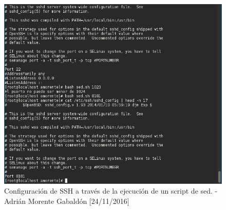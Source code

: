 	\begin{figure}[H]
		\centering
		\includegraphics[scale=0.55]{sed-sh}
		\caption{Configuración de SSH a través de la ejecución de un script de sed. - Adrián Morente Gabaldón [24/11/2016]}
		\label{fig:figura16}
	\end{figure}
	
